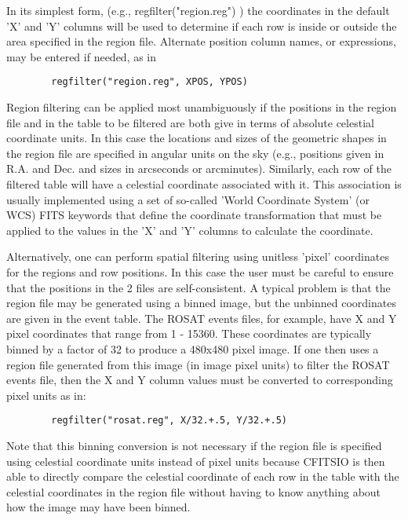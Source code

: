\documentclass[11pt]{book}
\begin{document}
    In its simplest form, (e.g., regfilter("region.reg") ) the
    coordinates in the default 'X' and 'Y' columns will be used to
    determine if each row is inside or outside the area specified in
    the region file.  Alternate position column names, or expressions,
    may be entered if needed, as in

\begin{verbatim}
        regfilter("region.reg", XPOS, YPOS)
\end{verbatim}
    Region filtering can be applied most unambiguously if the positions
    in the region file and in the table to be filtered are both give in
    terms of absolute celestial coordinate units.  In this case the
    locations and sizes of the geometric shapes in the region file are
    specified in angular units on the sky (e.g., positions given in
    R.A. and Dec.  and sizes in arcseconds or arcminutes).  Similarly,
    each row of the filtered table will have a celestial coordinate
    associated with it.  This association is usually implemented using
    a set of so-called 'World Coordinate System' (or WCS) FITS keywords
    that define the coordinate transformation that must be applied to
    the values in the 'X' and 'Y' columns to calculate the coordinate.

    Alternatively, one can perform spatial filtering using unitless
    'pixel' coordinates for the regions and row positions.  In this
    case the user must be careful to ensure that the positions in the 2
    files are self-consistent.  A typical problem is that the region
    file may be generated using a binned image, but the unbinned
    coordinates are given in the event table.  The ROSAT events files,
    for example, have X and Y pixel coordinates that range from 1 -
    15360.  These coordinates are typically binned by a factor of 32 to
    produce a 480x480 pixel image.  If one then uses a region file
    generated from this image (in image pixel units) to filter the
    ROSAT events file, then the X and Y column values must be converted
    to corresponding pixel units as in:

\begin{verbatim}
        regfilter("rosat.reg", X/32.+.5, Y/32.+.5)
\end{verbatim}
    Note that this binning conversion is not necessary if the region
    file is specified using celestial coordinate units instead of pixel
    units because CFITSIO is then able to directly compare the
    celestial coordinate of each row in the table with the celestial
    coordinates in the region file without having to know anything
    about how the image may have been binned.
\end{document}
